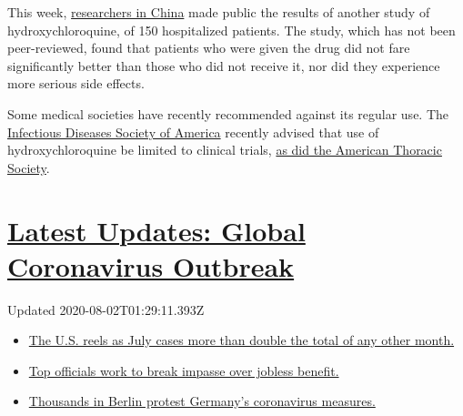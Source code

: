 This week,
\href{https://www.medrxiv.org/content/10.1101/2020.04.10.20060558v1}{researchers
in China} made public the results of another study of
hydroxychloroquine, of 150 hospitalized patients. The study, which has
not been peer-reviewed, found that patients who were given the drug did
not fare significantly better than those who did not receive it, nor did
they experience more serious side effects.

Some medical societies have recently recommended against its regular
use. The
\href{https://www.idsociety.org/practice-guideline/covid-19-guideline-treatment-and-management/}{Infectious
Diseases Society of America} recently advised that use of
hydroxychloroquine be limited to clinical trials,
\href{https://www.thoracic.org/about/newsroom/press-releases/journal/2020/ats-publishes-new-guidance-on-covid-19-management.php}{as
did the American Thoracic Society}.

\hypertarget{latest-updates-global-coronavirus-outbreak}{%
\section{\texorpdfstring{\href{https://www.nytimes.com/2020/08/01/world/coronavirus-covid-19.html?action=click\&pgtype=Article\&state=default\&region=MAIN_CONTENT_1\&context=storylines_live_updates}{Latest
Updates: Global Coronavirus
Outbreak}}{Latest Updates: Global Coronavirus Outbreak}}\label{latest-updates-global-coronavirus-outbreak}}

Updated 2020-08-02T01:29:11.393Z

\begin{itemize}
\tightlist
\item
  \href{https://www.nytimes.com/2020/08/01/world/coronavirus-covid-19.html?action=click\&pgtype=Article\&state=default\&region=MAIN_CONTENT_1\&context=storylines_live_updates\#link-34047410}{The
  U.S. reels as July cases more than double the total of any other
  month.}
\item
  \href{https://www.nytimes.com/2020/08/01/world/coronavirus-covid-19.html?action=click\&pgtype=Article\&state=default\&region=MAIN_CONTENT_1\&context=storylines_live_updates\#link-3ac56579}{Top
  officials work to break impasse over jobless benefit.}
\item
  \href{https://www.nytimes.com/2020/08/01/world/coronavirus-covid-19.html?action=click\&pgtype=Article\&state=default\&region=MAIN_CONTENT_1\&context=storylines_live_updates\#link-25930521}{Thousands
  in Berlin protest Germany's coronavirus measures.}
\end{itemize}

